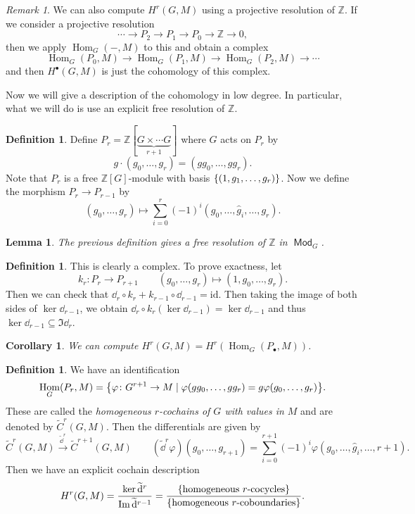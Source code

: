 \documentclass[leqno, openany]{memoir}
\newtheorem{cor}[thm]{Corollary}
\newtheorem{lem}[thm]{Lemma}
\theoremstyle{definition}
\newtheorem{defn}[thm]{Definition}
\theoremstyle{remark}
\newtheorem{rmk}[thm]{Remark}
\theoremstyle{plain}
\theoremstyle{definition}
\theoremstyle{remark}
\newcommand{\Z}{\mathbb{Z}}
\newcommand{\mr}[1]{\mathrm{#1}}
\newcommand{\wt}[1]{\widetilde{#1}}
\newcommand{\wh}[1]{\widehat{#1}}
\DeclareMathOperator{\Hom}{Hom}
\DeclareMathOperator{\Mod}{\mathsf{Mod}}
\begin{document}
\begin{rmk} We can also compute $H^r(G, M)$ using a projective resolution of
    $\Z$. If we consider a projective resolution \[ \cdots \to P_2 \to P_1 \to
        P_0 \to \Z \to 0, \] then we apply $\Hom_G(-,M)$ to this and obtain a
        complex \[ \Hom_G(P_0, M) \to \Hom_G(P_1, M) \to \Hom_G(P_2, M) \to
        \cdots \] and then $H^{\bullet}(G, M)$ is just the cohomology of this
    complex.  \end{rmk}

Now we will give a description of the cohomology in low degree. In particular,
what we will do is use an explicit free resolution of $\Z$.

\begin{defn} Define $P_r = \Z[\underbrace{G \times \cdots G}_{r+1}]$ where $G$
    acts on $P_r$ by \[ g \cdot (g_0, \ldots, g_r) = (gg_0, \ldots, gg_r). \]
    Note that $P_r$ is a free $\Z[G]$-module with basis $\qty{(1, g_1, \ldots,
    g_r)}$. Now we define the morphism $P_r \to P_{r-1}$ by \[ (g_0, \ldots,
    g_r) \mapsto \sum_{i=0}^r {(-1)}^i (g_0, \ldots, \wh{g}_i, \ldots, g_r). \]
\end{defn}

\begin{lem} The previous definition gives a free resolution of $\Z$ in
$\Mod_G$.  \end{lem}

\begin{defn} This is clearly a complex. To prove exactness, let \[ k_r \colon
P_r \to P_{r+1} \qquad (g_0, \ldots, g_r) \mapsto (1, g_0, \ldots, g_r). \]
Then we can check that $\dd_r \circ k_r + k_{r-1} \circ \dd_{r-1} = \mr{id}$.
Then taking the image of both sides of $\ker \dd_{r-1}$, we obtain $\dd_r \circ
k_r (\ker \dd_{r-1}) = \ker \dd_{r-1}$ and thus $\ker \dd_{r-1} \subseteq \Im
\dd_r$.  \end{defn}

\begin{cor} We can compute $H^r(G, M) = H^r(\Hom_G(P_{\bullet}, M))$.
\end{cor}

\begin{defn} We have an identification \[ \Hom_G(P_r, M) = \qty{\varphi \colon
G^{r+1} \to M \mid \varphi(g g_0, \ldots, g g_r) = g \varphi(g_0, \ldots,
g_r)}. \] These are called the \textit{homogeneous $r$-cochains of $G$ with
values in $M$} and are denoted by $\wt{C}^r(G, M)$. Then the differentials are
given by \[ \wt{C}^r(G,M) \xrightarrow{\wt{\dd}^r} \wt{C}^{r+1}(G,M) \qquad
(\wt{\dd}^r \varphi) (g_0, \ldots, g_{r+1}) = \sum_{i=0}^{r+1} {(-1)}^i \varphi
(g_0, \ldots, \wh{g}_i, \ldots, r+1). \] Then we have an explicit cochain
description \[ H^r(G, M) = \frac{\ker \wt{\dd}^r}{\Im \wt{\dd}^{r-1}} =
\frac{\qty{\text{homogeneous $r$-cocycles}}}{\qty{\text{homogeneous
$r$-coboundaries}}}. \] \end{defn}
\end{document}
